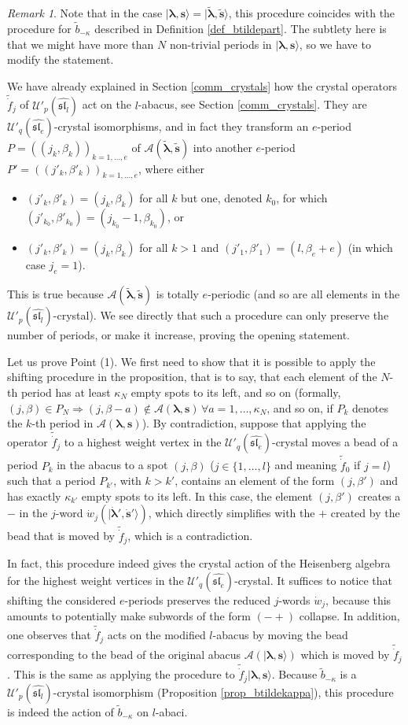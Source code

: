 \documentclass[twoside,12pt]{amsart}
\theoremstyle{plain}
\newcommand{\cA}{\mathcal{A}}
\newcommand{\bs}{\mathbf{s}}
\newcommand{\be}{\beta}
\newcommand{\la}{\lambda}
\newcommand{\ka}{\kappa}
\newcommand{\bla}{\boldsymbol{\la}}
\newcommand{\tb}{\tilde{b}}
\newcommand{\dw}{\dot{w}}
\newcommand{\dbs}{\dot{\bs}}
\newcommand{\dbla}{\dot{\bla}}
\newcommand{\tdf}{\tilde{\dot{f}}}
\newcommand{\tbla}{\tilde{\bla}}
\newcommand{\tbs}{\tilde{\bs}}
\newcommand{\Ra}{\Rightarrow}
\newcommand{\Ue}{\mathcal{U}'_q (\widehat{\mathfrak{sl}_e})}
\newcommand{\Ul}{\mathcal{U}'_p (\widehat{\mathfrak{sl}_l})}
\theoremstyle{remark}
\newtheorem{rem}[num]{Remark}
\begin{document}
\begin{rem}
Note that in the case $|{\bla},\bs\rangle=|{\tbla},\tbs\rangle$, this procedure
coincides with the procedure for $\tb_{-\ka}$ described in Definition \ref{def_btildepart}.
The subtlety here is that we might have more than $N$ non-trivial periods in $|\bla,\bs\rangle$,
so we have to modify the statement.
\end{rem}

\proof
We have already explained in Section \ref{comm_crystals} how the crystal operators $\tdf_j$ of $\Ul$ act on the $l$-abacus,
see Section \ref{comm_crystals}.
They are $\Ue$-crystal isomorphisms, and in fact they transform an $e$-period $P=((j_k,\be_k))_{k=1,\dots,e}$
of $\cA(\tbla,\tbs)$ into another $e$-period $P'=((j'_k,\be'_k))_{k=1,\dots,e}$,
where either 
\begin{itemize}
 \item $(j'_k,\be'_k)=(j_k,\be_k)$ for all $k$ but one, denoted $k_0$, for which $(j'_{k_0},\be'_{k_0})=(j_{k_0}-1,\be_{k_0})$, or
 \item $(j'_k,\be'_k)=(j_k,\be_k)$ for all $k>1$ and $(j'_1,\be'_1)=(l,\be_e+e)$
 (in which case $j_e=1$).
\end{itemize}
This is true because $\cA(\tbla,\tbs)$ is totally $e$-periodic
(and so are all elements in the $\Ul$-crystal).
We see directly that such a procedure can only preserve the number of periods, or make it increase,
proving the opening statement.

Let us prove Point (1).
We first need to show that it is possible to apply the shifting procedure
in the proposition,
that is to say, that each element of the $N$-th period has at least 
$\ka_{N}$ empty spots to its left, and so on
(formally, $(j,\be)\in P_{N} \Ra (j,\be-a)\notin \cA(\bla,\bs) \, \forall a=1,\dots,\ka_{N}$,
and so on, if $P_k$ denotes the $k$-th period in $\cA(\bla,\bs)$).
By contradiction, suppose that
applying the operator $\tdf_j$ to a highest weight vertex in the $\Ue$-crystal 
moves a bead of a period $P_k$ in the abacus to a spot $(j,\be)$ ($j\in\{1,\dots,l\}$ and meaning $\tdf_0$ if $j=l$) 
such that a period $P_{k'}$, with $k>k'$, contains an element of the form $(j,\be')$ and has exactly $\ka_{k'}$
empty spots to its left.
In this case, the element $(j,\be')$ creates a $-$ in the $j$-word $\dw_j(|\dbla',\dbs'\rangle)$, which directly
simplifies with the $+$ created by the bead that is moved by $\tdf_j$,
which is a contradiction.

In fact, this procedure indeed gives the crystal action of the Heisenberg algebra for
the highest weight vertices in the $\Ue$-crystal.
It suffices to notice that shifting the considered $e$-periods preserves the reduced $j$-words $\dw_j$,
because this amounts to potentially make subwords of the form $(-+)$ collapse.
In addition, one observes that $\tdf_j$ acts on the modified $l$-abacus by 
moving the bead corresponding to the bead of the original abacus $\cA(|\bla,\bs\rangle)$
which is moved by $\tdf_j$.
This is the same as applying the procedure to $\tdf_j|\bla,\bs\rangle$.
Because $\tb_{-\ka}$ is a $\Ul$-crystal isomorphism (Proposition \ref{prop_btildekappa}),
this procedure is indeed the action of $\tb_{-\ka}$ on $l$-abaci.
\end{document}
